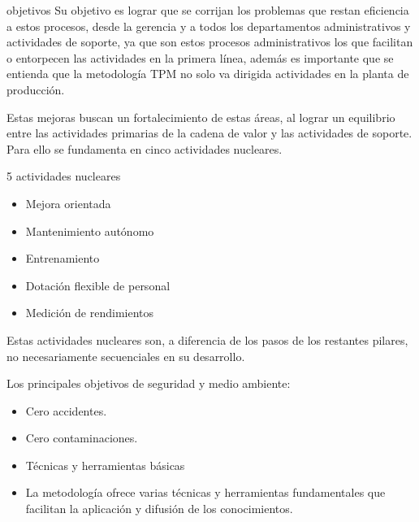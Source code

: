 \documentclass[./pmain.tex]{subfiles}
\begin{document}
\begin{frame}{objetivos}
Su objetivo es lograr que se corrijan los problemas que restan eficiencia a estos procesos, desde la gerencia y a todos los departamentos administrativos y actividades de soporte, ya que son estos procesos administrativos los que facilitan o entorpecen las actividades en la primera línea, además es importante que se entienda que la metodología TPM no solo va dirigida actividades en la planta de producción.

Estas mejoras buscan un fortalecimiento de estas áreas, al lograr un equilibrio entre las actividades primarias de la cadena de valor y las actividades de soporte. Para ello se fundamenta en cinco actividades nucleares.
\end{frame}
\begin{frame}{5 actividades nucleares}
\begin{itemize}
\item Mejora orientada
\item Mantenimiento autónomo
\item Entrenamiento
\item Dotación flexible de personal
\item Medición de rendimientos
\end{itemize}

Estas actividades nucleares son, a diferencia de los pasos de los restantes pilares, no necesariamente secuenciales en su desarrollo.
\end{frame}
\begin{frame}{
Los principales objetivos de seguridad y medio ambiente:
}
\begin{itemize}
\item Cero accidentes.
\item Cero contaminaciones.
\item Técnicas y herramientas básicas
\item La metodología ofrece varias técnicas y herramientas fundamentales que facilitan la aplicación y difusión de los conocimientos. 
\end{itemize}
\end{frame}



\end{document}
